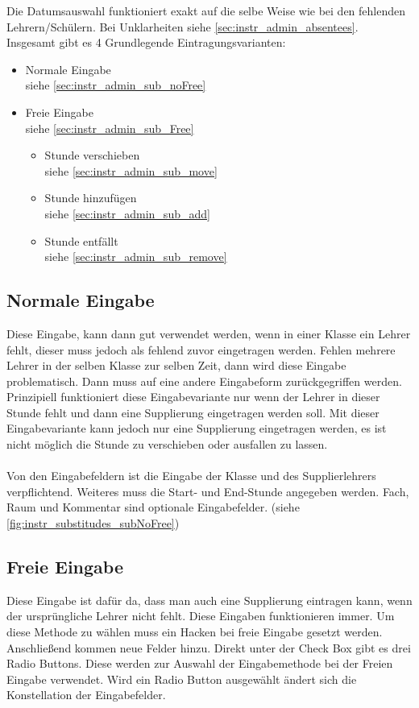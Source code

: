 Die Datumsauswahl funktioniert exakt auf die selbe Weise wie bei den fehlenden Lehrern/Schülern. Bei Unklarheiten siehe \autoref{sec:instr_admin_absentees}.\\
Insgesamt gibt es 4 Grundlegende Eintragungsvarianten:
\begin{itemize}
	\item Normale Eingabe\\
		siehe \autoref{sec:instr_admin_sub_noFree}
	\item Freie Eingabe\\
		siehe \autoref{sec:instr_admin_sub_Free}
		\begin{itemize}
			\item Stunde verschieben\\
				siehe \autoref{sec:instr_admin_sub_move}
			\item Stunde hinzufügen\\
				siehe \autoref{sec:instr_admin_sub_add}
			\item Stunde entfällt\\
				siehe \autoref{sec:instr_admin_sub_remove}
		\end{itemize}
\end{itemize}
\subsection{Normale Eingabe}\label{sec:instr_admin_sub_noFree}
Diese Eingabe, kann dann gut verwendet werden, wenn in einer Klasse ein Lehrer fehlt, dieser muss jedoch als fehlend zuvor eingetragen werden. Fehlen mehrere Lehrer in der selben Klasse zur selben Zeit, dann wird diese Eingabe problematisch. Dann muss auf eine andere Eingabeform zurückgegriffen werden.\\
Prinzipiell funktioniert diese Eingabevariante nur wenn der Lehrer in dieser Stunde fehlt und dann eine Supplierung eingetragen werden soll. Mit dieser Eingabevariante kann jedoch nur eine Supplierung eingetragen werden, es ist nicht möglich die Stunde zu verschieben oder ausfallen zu lassen.\\\\
Von den Eingabefeldern ist die Eingabe der Klasse und des Supplierlehrers verpflichtend. Weiteres muss die Start- und End-Stunde angegeben werden. Fach, Raum und Kommentar sind optionale Eingabefelder. (siehe \autoref{fig:instr_substitudes_subNoFree})
\subsection{Freie Eingabe}\label{sec:instr_admin_sub_Free}
Diese Eingabe ist dafür da, dass man auch eine Supplierung eintragen kann, wenn der ursprüngliche Lehrer nicht fehlt. Diese Eingaben funktionieren immer. Um diese Methode zu wählen muss ein Hacken bei freie Eingabe gesetzt werden. Anschließend kommen neue Felder hinzu. Direkt unter der Check Box gibt es drei Radio Buttons. Diese werden zur Auswahl der Eingabemethode bei der Freien Eingabe verwendet. Wird ein Radio Button ausgewählt ändert sich die Konstellation der Eingabefelder.
